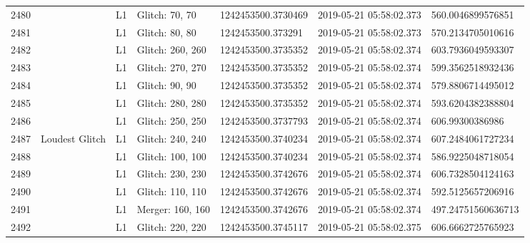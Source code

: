 \begin{longtable}{lllllll}
2480 &                                                    &       L1 &    Glitch: 70, 70 &  1242453500.3730469 &  2019-05-21 05:58:02.373 &   560.0046899576851 \\
2481 &                                                    &       L1 &    Glitch: 80, 80 &   1242453500.373291 &  2019-05-21 05:58:02.373 &   570.2134705010616 \\
2482 &                                                    &       L1 &  Glitch: 260, 260 &  1242453500.3735352 &  2019-05-21 05:58:02.374 &   603.7936049593307 \\
2483 &                                                    &       L1 &  Glitch: 270, 270 &  1242453500.3735352 &  2019-05-21 05:58:02.374 &   599.3562518932436 \\
2484 &                                                    &       L1 &    Glitch: 90, 90 &  1242453500.3735352 &  2019-05-21 05:58:02.374 &   579.8806714495012 \\
2485 &                                                    &       L1 &  Glitch: 280, 280 &  1242453500.3735352 &  2019-05-21 05:58:02.374 &   593.6204382388804 \\
2486 &                                                    &       L1 &  Glitch: 250, 250 &  1242453500.3737793 &  2019-05-21 05:58:02.374 &     606.99300386986 \\
2487 &                                     Loudest Glitch &       L1 &  Glitch: 240, 240 &  1242453500.3740234 &  2019-05-21 05:58:02.374 &   607.2484061727234 \\
2488 &                                                    &       L1 &  Glitch: 100, 100 &  1242453500.3740234 &  2019-05-21 05:58:02.374 &   586.9225048718054 \\
2489 &                                                    &       L1 &  Glitch: 230, 230 &  1242453500.3742676 &  2019-05-21 05:58:02.374 &   606.7328504124163 \\
2490 &                                                    &       L1 &  Glitch: 110, 110 &  1242453500.3742676 &  2019-05-21 05:58:02.374 &   592.5125657206916 \\
2491 &                                                    &       L1 &  Merger: 160, 160 &  1242453500.3742676 &  2019-05-21 05:58:02.374 &  497.24751560636713 \\
2492 &                                                    &       L1 &  Glitch: 220, 220 &  1242453500.3745117 &  2019-05-21 05:58:02.375 &   606.6662725765923 \\

\end{longtable}
